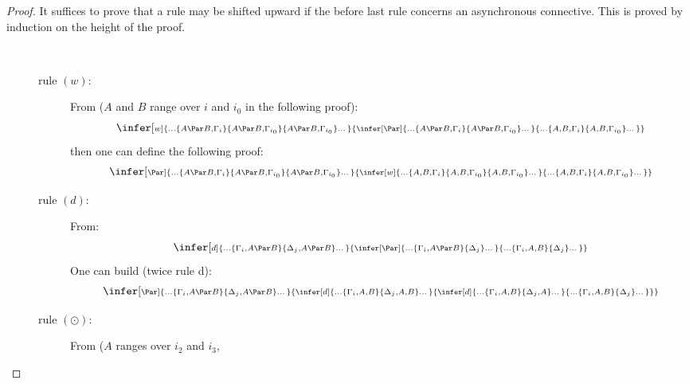 \documentclass{llncs}
\def\scriptInfer[#1]#2#3{\infer[\scriptstyle #1]{\scriptstyle #2}{\scriptstyle #3}}\def\scriptInferD#1#2{\infer{\scriptstyle #1}{\scriptstyle #2}}
\newcommand{\ctimes}{\odot}
\begin{document}
\begin{proof}
It suffices to prove that a rule may be shifted upward if the before last rule
concerns an asynchronous connective. This is proved by induction on the 
height of the proof.

\begin{description}
\item[] \ \\
     \begin{description}
     \item[rule $(w)$: ] From ($A$ and $B$ range over $i$ and $i_0$ in the following proof):
          $$\scriptInfer[w]{\dots \{A \Par B, \Gamma_i\} 
                            \{A \Par B, \Gamma_{i_0}\} 
                            \{A \Par B, \Gamma_{i_0}\} \dots}
                  {\scriptInfer[\Par]{\dots \{A \Par B, \Gamma_i\} 
                                      \{A \Par B, \Gamma_{i_0}\} \dots}
                         {\dots \{A, B, \Gamma_i\} 
                                \{A, B, \Gamma_{i_0}\} \dots}
                   }
          $$
          then one can define the following proof:
          $$\scriptInfer[\Par]{\dots \{A \Par B, \Gamma_i\} 
                               \{A \Par B, \Gamma_{i_0}\} 
                               \{A \Par B, \Gamma_{i_0}\} \dots}
                  {\scriptInfer[w]{\dots \{A, B, \Gamma_i\} 
                                   \{A, B, \Gamma_{i_0}\} 
                                   \{A, B, \Gamma_{i_0}\} \dots}
                         {\dots \{A, B, \Gamma_i\} 
                                \{A, B, \Gamma_{i_0}\} \dots}
                   }
          $$
     \item[rule $(d)$: ] From:
          $$\scriptInfer[d]{\dots \{\Gamma_i, A\Par B\} 
                            \{\Delta_j, A\Par B\} \dots}
               {\scriptInfer[\Par]{\dots \{\Gamma_i, A\Par B\} 
                                   \{\Delta_j\} \dots}
                    {\dots \{\Gamma_i, A, B\} 
                           \{\Delta_j\} \dots}
               }
          $$
          One can build (twice rule d):
          $$\scriptInfer[\Par]{\dots \{\Gamma_i, A\Par B\} 
                               \{\Delta_j, A\Par B\} \dots}{
		\scriptInfer[d]{\dots \{\Gamma_i, A, B\}\{\Delta_j, A, B\} \dots}
                {	\scriptInfer[d]{\dots \{\Gamma_i, A, B\}\{\Delta_j, A\} \dots}
                    		{\dots \{\Gamma_i, A, B\}\{\Delta_j\} \dots}
		}
               }
          $$        
     \item[rule $(\ctimes)$: ] From ($A$ ranges over $i_2$ and $i_3$,

\end{description}
\end{description}
\end{proof}
\end{document}

